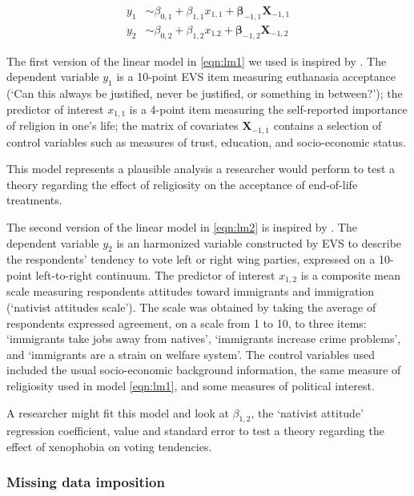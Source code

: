 	\begin{subequations}
	\begin{align}
		y_1 &\sim \beta_{0,1} + \beta_{1,1} x_{1,1} + \bm{\beta}_{-1,1} \bm{X}_{-1,1}  \label{eqn:lm1} \\
		y_2 &\sim \beta_{0,2} + \beta_{1,2} x_{1.2} + \bm{\beta}_{-1,2} \bm{X}_{-1,2}  \label{eqn:lm2}
	\end{align}
	\end{subequations}

	The first version of the linear model in \ref{eqn:lm1} we used is inspired by \cite{koneke:2014}.
	The dependent variable $y_1$ is a 10-point EVS item measuring euthanasia acceptance 
	(`Can this always be justified, never be justified, or something in between?');
	the predictor of interest $x_{1,1}$ is a 4-point item measuring the self-reported importance of religion in 
	one's life;
	the matrix of covariates $\bm{X}_{-1,1}$ contains a selection of control variables such as measures of trust, 
	education, and socio-economic status.

	This model represents a plausible analysis a researcher would perform to test a theory regarding the 
	effect of religiosity on the acceptance of end-of-life treatments.

	The second version of the linear model in \ref{eqn:lm2} is inspired by \cite{immerzeel:2015}.
	The dependent variable $y_2$ is an harmonized variable constructed by EVS to describe the respondents' 
	tendency to vote left or right wing parties, expressed on a 10-point left-to-right continuum.
	The predictor of interest $x_{1,2}$ is a composite mean scale measuring respondents attitudes toward immigrants 
	and immigration (`nativist attitudes scale').
	The scale was obtained by taking the average of respondents expressed agreement, on a scale from 
	1 to 10, to three items: `immigrants take jobs away from natives', `immigrants increase crime problems', and 
	`immigrants are a strain on welfare system'.
	The control variables used included the usual socio-economic background information, the same measure of
	religiosity used in model \ref{eqn:lm1}, and some measures of political interest.

	A researcher might fit this model and look at $\beta_{1,2}$, the `nativist attitude' regression 
	coefficient, value and standard error to test a theory regarding the effect of xenophobia on voting 
	tendencies.

\subsubsection{Missing data imposition}

